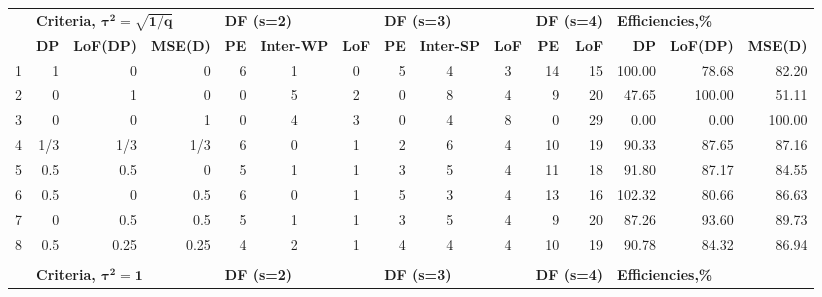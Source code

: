 \begin{table}[h]
{\begin{tabular}{rrrrccccccrrrrr}
  & \multicolumn{3}{l}{\textbf{Criteria, $\bm{\tau^2=\sqrt{1/q}}$}}    & \multicolumn{3}{l}{\textbf{DF (s=2)}}   & \multicolumn{3}{l}{\textbf{DF (s=3)}}    & \multicolumn{2}{l}{\textbf{DF (s=4)}} & \multicolumn{3}{l}{\textbf{Efficiencies,\%}}     \\
  & \textbf{DP} & \textbf{LoF(DP)} & \textbf{MSE(D)} & \textbf{PE} & \textbf{Inter-WP} & \textbf{LoF} & \textbf{PE} & \textbf{Inter-SP} & \textbf{LoF}& \textbf{PE}      & \textbf{LoF}      & \textbf{DP} & \textbf{LoF(DP)} & \textbf{MSE(D)} \\      
1 & 1    & 0    & 0    & \multicolumn{1}{|r}{6} & 1 & 0 & \multicolumn{1}{|r}{5} & 4 & 3  & \multicolumn{1}{|r}{14} & 15 & \multicolumn{1}{|r}{100.00} & 78.68  & 82.20  \\
2 & 0    & 1    & 0    & \multicolumn{1}{|r}{0} & 5 & 2 & \multicolumn{1}{|r}{0} & 8 & 4  & \multicolumn{1}{|r}{9}  & 20 & \multicolumn{1}{|r}{47.65}  & 100.00 & 51.11  \\
3 & 0    & 0    & 1    & \multicolumn{1}{|r}{0} & 4 & 3 & \multicolumn{1}{|r}{0} & 4 & 8  & \multicolumn{1}{|r}{0}  & 29 & \multicolumn{1}{|r}{0.00}   & 0.00   & 100.00 \\
4 & 1/3 & 1/3 & 1/3 & \multicolumn{1}{|r}{6} & 0 & 1 & \multicolumn{1}{|r}{2} & 6 & 4  & \multicolumn{1}{|r}{10} & 19 & \multicolumn{1}{|r}{90.33}  & 87.65  & 87.16  \\
5 & 0.5  & 0.5  & 0    & \multicolumn{1}{|r}{5} & 1 & 1 & \multicolumn{1}{|r}{3} & 5 & 4  & \multicolumn{1}{|r}{11} & 18 & \multicolumn{1}{|r}{91.80}  & 87.17  & 84.55  \\
6 & 0.5  & 0    & 0.5  & \multicolumn{1}{|r}{6} & 0 & 1 & \multicolumn{1}{|r}{5} & 3 & 4  & \multicolumn{1}{|r}{13} & 16 & \multicolumn{1}{|r}{102.32} & 80.66  & 86.63  \\
7 & 0    & 0.5  & 0.5  & \multicolumn{1}{|r}{5} & 1 & 1 & \multicolumn{1}{|r}{3} & 5 & 4  & \multicolumn{1}{|r}{9}  & 20 & \multicolumn{1}{|r}{87.26}  & 93.60  & 89.73  \\
8 & 0.5  & 0.25 & 0.25 & \multicolumn{1}{|r}{4} & 2 & 1 & \multicolumn{1}{|r}{4} & 4 & 4  & \multicolumn{1}{|r}{10} & 19 & \multicolumn{1}{|r}{90.78}  & 84.32  & 86.94 \\
  &      &      &      &   &   &   &   &   &    &    &    &        &        &        \\ 
  & \multicolumn{3}{l}{\textbf{Criteria, $\bm{\tau^2=1}$}}    & \multicolumn{3}{l}{\textbf{DF (s=2)}}   & \multicolumn{3}{l}{\textbf{DF (s=3)}}    & \multicolumn{2}{l}{\textbf{DF (s=4)}} & \multicolumn{3}{l}{\textbf{Efficiencies,\%}}     \\

\end{tabular}}
\end{table}
